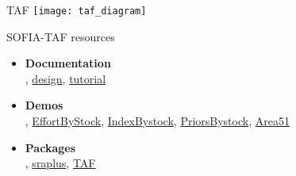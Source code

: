 \documentclass[aspectratio=169]{beamer}
\begin{document}

\begin{frame}{TAF}
  \centering
  \texttt{[image: taf\_diagram]}
\end{frame}


\begin{frame}[plain]
\end{frame}


\begin{frame}[plain]
\end{frame}


\begin{frame}{SOFIA-TAF resources}
  \begin{itemize}
    \item[] {\bf\darkgray Documentation}\\[0.5ex]
    ,
    {\blue\href{https://arni-magnusson.github.io/pdf/2021-sofia-taf.pdf}{design}},
    {\blue\href{https://github.com/sofia-taf/doc/blob/main/sofia_taf_tutorial.md}{tutorial}}\\[5ex]
    \item[] {\bf\darkgray Demos}\\[0.5ex]
    ,
    {\blue\href{https://github.com/sofia-taf/2022Area31EffortByStock}{EffortByStock}},
    {\blue\href{https://github.com/sofia-taf/2022Area31IndexByStock}{IndexBystock}},
    {\blue\href{https://github.com/sofia-taf/2022Area41PriorsByStock}{PriorsBystock}},
    {\blue\href{https://github.com/sofia-taf/2023Area51Demo}{Area51}}\\[5ex]
    \item[] {\bf\darkgray Packages}\\[0.5ex]
    ,
    {\blue\href{https://github.com/DanOvando/sraplus}{sraplus}},
    {\blue\href{https://github.com/ices-tools-prod/TAF}{TAF}}
  \end{itemize}
\end{frame}
\end{document}
